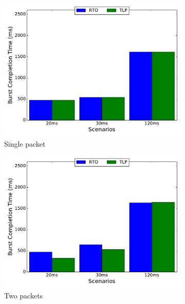 \documentclass[10pt,conference]{IEEEtran}
\begin{document}
\begin{figure}
 \begin{subfigure}{0.32\textwidth}
	\includegraphics[angle=0, width=\textwidth,natwidth=578.16,natheight=433.62]{plots/T1P.pdf}
	\caption{Single packet}\label{t1p}
 \end{subfigure}
 \hfill
 \begin{subfigure}{0.32\textwidth}
	\includegraphics[angle=0, width=\textwidth,natwidth=578.16,natheight=433.62]{plots/T2P.pdf}
	\caption{Two packets }\label{t2p}
 \end{subfigure}
 \hfill
 \begin{subfigure}{0.32\textwidth}

\end{subfigure}
\end{figure}
\end{document}
